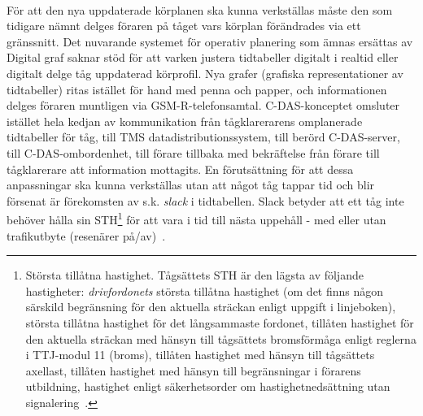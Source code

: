 \paragraph{}
\hspace{-11pt}För att den nya uppdaterade körplanen ska kunna verkställas måste den som tidigare nämnt delges föraren på tåget vars körplan förändrades via ett gränssnitt.
Det nuvarande systemet för operativ planering som ämnas ersättas av Digital graf saknar stöd för att varken justera tidtabeller digitalt i realtid eller digitalt delge tåg uppdaterad körprofil.
Nya grafer (grafiska representationer av tidtabeller) ritas istället för hand med penna och papper, och informationen delges föraren muntligen via GSM-R-telefonsamtal.
C-DAS-konceptet omsluter istället hela kedjan av kommunikation från tågklarerarens omplanerade tidtabeller för tåg, till TMS datadistributionssystem, till berörd C-DAS-server, till C-DAS-ombordenhet, till förare tillbaka med bekräftelse från förare till tågklarerare att information mottagits.
En förutsättning för att dessa anpassningar ska kunna verkställas utan att något tåg tappar tid och blir försenat är förekomsten av s.k. \emph{slack} i tidtabellen.
Slack betyder att ett tåg inte behöver hålla sin STH\footnote{Största tillåtna hastighet. Tågsättets STH är den lägsta av följande hastigheter: \emph{drivfordonets} största tillåtna hastighet (om det finns någon särskild begränsning för den aktuella sträckan enligt uppgift i linjeboken), största tillåtna hastighet för det långsammaste fordonet, tillåten hastighet för den aktuella sträckan med hänsyn till tågsättets bromsförmåga enligt reglerna i TTJ-modul 11 (broms), tillåten hastighet med hänsyn till tågsättets axellast, tillåten hastighet med hänsyn till begränsningar i förarens utbildning, hastighet enligt säkerhetsorder om hastighetnedsättning utan signalering~\cite{TTJ2015}.} för att vara i tid till nästa uppehåll - med eller utan trafikutbyte (resenärer på/av)~\cite{Lindmark2022}.

